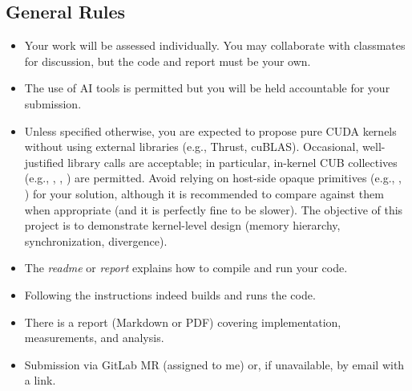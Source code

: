 \subsection*{General Rules}
\begin{itemize}
    \item Your work will be assessed individually. You may collaborate with classmates for discussion, but the code and report must be your own.
    \item The use of AI tools is permitted but you will be held accountable for your submission.
    \item Unless specified otherwise, you are expected to propose pure CUDA kernels without using external libraries (e.g., Thrust, cuBLAS).
            Occasional, well-justified library calls are acceptable; in particular, in-kernel CUB collectives (e.g., , , ) are permitted.
            Avoid relying on host-side opaque primitives (e.g., , ) for your solution, although it is recommended to compare against them when appropriate (and it is perfectly fine to be slower).
            The objective of this project is to demonstrate kernel-level design (memory hierarchy, synchronization, divergence).
\end{itemize}

\begin{tcolorbox}[colback=gray!6,colframe=gray!50!black,title=Quick Checklist]
\begin{itemize}
    \item The \emph{readme} or \emph{report} explains how to compile and run your code.
    \item Following the instructions indeed builds and runs the code.
    \item There is a report (Markdown or PDF) covering implementation, measurements, and analysis.
    \item Submission via GitLab MR (assigned to me) or, if unavailable, by email with a link.
\end{itemize}
\end{tcolorbox}
